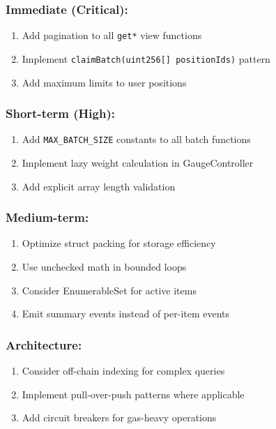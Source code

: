 \documentclass[
]{article}
\providecommand{\tightlist}{%
  \setlength{\itemsep}{0pt}\setlength{\parskip}{0pt}}
\begin{document}
\subsubsection{Immediate (Critical):}\label{immediate-critical}

\begin{enumerate}
\def\labelenumi{\arabic{enumi}.}
\tightlist
\item
  Add pagination to all \texttt{get*} view functions
\item
  Implement \texttt{claimBatch(uint256{[}{]}\ positionIds)} pattern
\item
  Add maximum limits to user positions
\end{enumerate}

\subsubsection{Short-term (High):}\label{short-term-high}

\begin{enumerate}
\def\labelenumi{\arabic{enumi}.}
\tightlist
\item
  Add \texttt{MAX\_BATCH\_SIZE} constants to all batch functions
\item
  Implement lazy weight calculation in GaugeController
\item
  Add explicit array length validation
\end{enumerate}

\subsubsection{Medium-term:}\label{medium-term}

\begin{enumerate}
\def\labelenumi{\arabic{enumi}.}
\tightlist
\item
  Optimize struct packing for storage efficiency
\item
  Use unchecked math in bounded loops
\item
  Consider EnumerableSet for active items
\item
  Emit summary events instead of per-item events
\end{enumerate}

\subsubsection{Architecture:}\label{architecture}

\begin{enumerate}
\def\labelenumi{\arabic{enumi}.}
\tightlist
\item
  Consider off-chain indexing for complex queries
\item
  Implement pull-over-push patterns where applicable
\item
  Add circuit breakers for gas-heavy operations
\end{enumerate}
\end{document}
